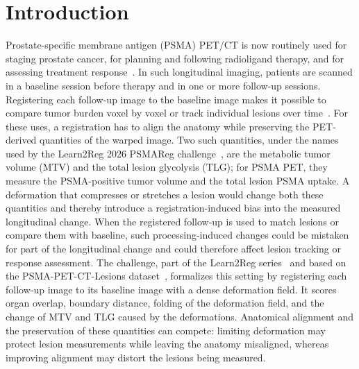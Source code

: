 \section{Introduction}
\label{sect:intro}

Prostate-specific membrane antigen (PSMA) PET/CT is now routinely used for staging prostate cancer, for planning and following radioligand therapy, and for assessing treatment response~\cite{ref_psma_clinical}.
In such longitudinal imaging, patients are scanned in a baseline session before therapy and in one or more follow-up sessions.
Registering each follow-up image to the baseline image makes it possible to compare tumor burden voxel by voxel or track individual lesions over time~\cite{ref_psmareg_challenge}.
For these uses, a registration has to align the anatomy while preserving the PET-derived quantities of the warped image.
Two such quantities, under the names used by the Learn2Reg 2026 PSMAReg challenge~\cite{ref_psmareg_challenge}, are the metabolic tumor volume (MTV) and the total lesion glycolysis (TLG); for PSMA PET, they measure the PSMA-positive tumor volume and the total lesion PSMA uptake.
A deformation that compresses or stretches a lesion would change both these quantities and thereby introduce a registration-induced bias into the measured longitudinal change.
When the registered follow-up is used to match lesions or compare them with baseline, such processing-induced changes could be mistaken for part of the longitudinal change and could therefore affect lesion tracking or response assessment.
The challenge, part of the Learn2Reg series~\cite{ref_learn2reg_hansen,ref_learn2reg_alessa} and based on the PSMA-PET-CT-Lesions dataset~\cite{ref_psmaregdata}, formalizes this setting by registering each follow-up image to its baseline image with a dense deformation field.
It scores organ overlap, boundary distance, folding of the deformation field, and the change of MTV and TLG caused by the deformations.
Anatomical alignment and the preservation of these quantities can compete: limiting deformation may protect lesion measurements while leaving the anatomy misaligned, whereas improving alignment may distort the lesions being measured.

